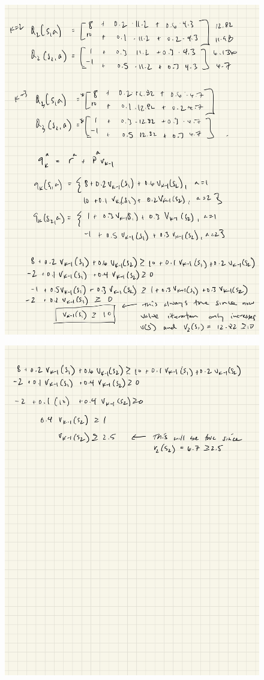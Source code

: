 \documentclass[12pt]{article}
\begin{document}
\begin{figure}[!htb]
	\centering
	\includegraphics[width=.75\textwidth]{ipad/q1_3.jpg}
\end{figure}

\begin{figure}[!htb]
	\centering
	\includegraphics[width=.75\textwidth]{ipad/q1_4.jpg}
\end{figure}
\end{document}
